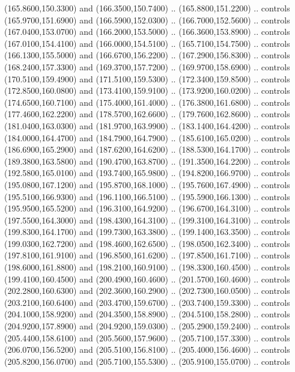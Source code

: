 {\begin{scope}[y=0.80pt, x=0.80pt, yscale=-1, xscale=1, inner sep=0pt, outer sep=0pt, #1]
      (165.8600,150.3300) and (166.3500,150.7400) .. (165.8800,151.2200) .. controls
      (165.9700,151.6900) and (166.5900,152.0300) .. (166.7000,152.5600) .. controls
      (167.0400,153.0700) and (166.2000,153.5000) .. (166.3600,153.8900) .. controls
      (167.0100,154.4100) and (166.0000,154.5100) .. (165.7100,154.7500) .. controls
      (166.1300,155.5000) and (166.6700,156.2200) .. (167.2900,156.8300) .. controls
      (168.2400,157.3300) and (169.3700,157.7200) .. (169.9700,158.6900) .. controls
      (170.5100,159.4900) and (171.5100,159.5300) .. (172.3400,159.8500) .. controls
      (172.8500,160.0800) and (173.4100,159.9100) .. (173.9200,160.0200) .. controls
      (174.6500,160.7100) and (175.4000,161.4000) .. (176.3800,161.6800) .. controls
      (177.4600,162.2200) and (178.5700,162.6600) .. (179.7600,162.8600) .. controls
      (181.0400,163.0300) and (181.9700,163.9900) .. (183.1400,164.4200) .. controls
      (184.0000,164.4700) and (184.7900,164.7900) .. (185.6100,165.0200) .. controls
      (186.6900,165.2900) and (187.6200,164.6200) .. (188.5300,164.1700) .. controls
      (189.3800,163.5800) and (190.4700,163.8700) .. (191.3500,164.2200) .. controls
      (192.5800,165.0100) and (193.7400,165.9800) .. (194.8200,166.9700) .. controls
      (195.0800,167.1200) and (195.8700,168.1000) .. (195.7600,167.4900) .. controls
      (195.5100,166.9300) and (196.1100,166.5100) .. (195.5900,166.1300) .. controls
      (195.9500,165.5200) and (196.3100,164.9200) .. (196.6700,164.3100) .. controls
      (197.5500,164.3000) and (198.4300,164.3100) .. (199.3100,164.3100) .. controls
      (199.8300,164.1700) and (199.7300,163.3800) .. (199.1400,163.3500) .. controls
      (199.0300,162.7200) and (198.4600,162.6500) .. (198.0500,162.3400) .. controls
      (197.8100,161.9100) and (196.8500,161.6200) .. (197.8500,161.7100) .. controls
      (198.6000,161.8800) and (198.2100,160.9100) .. (198.3300,160.4500) .. controls
      (199.4100,160.4500) and (200.4900,160.4600) .. (201.5700,160.4600) .. controls
      (202.2800,160.6300) and (202.3600,160.2900) .. (202.7300,160.0500) .. controls
      (203.2100,160.6400) and (203.4700,159.6700) .. (203.7400,159.3300) .. controls
      (204.1000,158.9200) and (204.3500,158.8900) .. (204.5100,158.2800) .. controls
      (204.9200,157.8900) and (204.9200,159.0300) .. (205.2900,159.2400) .. controls
      (205.4400,158.6100) and (205.5600,157.9600) .. (205.7100,157.3300) .. controls
      (206.0700,156.5200) and (205.5100,156.8100) .. (205.4000,156.4600) .. controls
      (205.8200,156.0700) and (205.7100,155.5300) .. (205.9100,155.0700) .. controls

\end{scope}}
